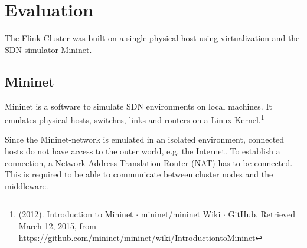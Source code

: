 \section{Evaluation}
The Flink Cluster was built on a single physical host using virtualization and the SDN simulator
Mininet.

\subsection{Mininet}
\label{sec:mininet}
Mininet is a software to simulate SDN environments on local machines. It  emulates physical hosts,
switches, links and routers on a Linux Kernel.\footnote{(2012). Introduction to Mininet $\cdot$
mininet/mininet Wiki $\cdot$ GitHub. Retrieved March 12, 2015, from
https://github.com/mininet/mininet/wiki/Introduction­to­Mininet}

Since the Mininet-network is emulated in an isolated environment, connected hosts do not have access
to the outer world, e.g. the Internet. To establish a connection, a Network Address Translation
Router (NAT) has to be connected. This is required to be able to communicate between cluster nodes
and the middleware.

